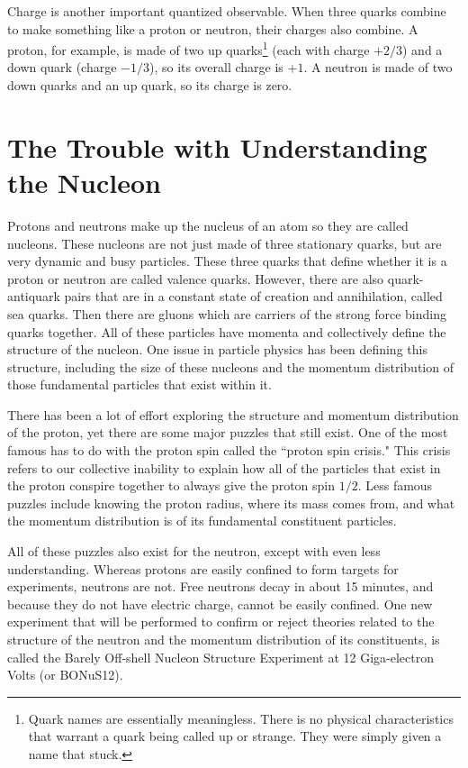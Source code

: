 Charge is another important quantized observable. When three quarks combine to make something like a proton or neutron, their charges also combine. A proton, for example, is made of two up quarks\footnote{Quark names are essentially meaningless. There is no physical characteristics that warrant a quark being called up or strange. They were simply given a name that stuck.} (each with charge $+2/3$) and a down quark (charge $-1/3$), so its overall charge is $+1$. A neutron is made of two down quarks and an up quark, so its charge is zero.

\section{The Trouble with Understanding the Nucleon}
Protons and neutrons make up the nucleus of an atom so they are called nucleons. These nucleons are not just made of three stationary quarks, but are very dynamic and busy particles. These three quarks that define whether it is a proton or neutron are called valence quarks. However, there are also quark-antiquark pairs that are in a constant state of creation and annihilation, called sea quarks. Then there are gluons which are carriers of the strong force binding quarks together. All of these particles have momenta and collectively define the structure of the nucleon. One issue in particle physics has been defining this structure, including the size of these nucleons and the momentum distribution of those fundamental particles that exist within it.

There has been a lot of effort exploring the structure and momentum distribution of the proton, yet there are some major puzzles that still exist. One of the most famous has to do with the proton spin called the ``proton spin crisis." This crisis refers to our collective inability to explain how all of the particles that exist in the proton conspire together to always give the proton spin $1/2$. Less famous puzzles include knowing the proton radius, where its mass comes from, and what the momentum distribution is of its fundamental constituent particles.

All of these puzzles also exist for the neutron, except with even less understanding. Whereas protons are easily confined to form targets for experiments, neutrons are not. Free neutrons decay in about 15 minutes, and because they do not have electric charge, cannot be easily confined. One new experiment that will be performed to confirm or reject theories related to the structure of the neutron and the momentum distribution of its constituents, is called the Barely Off-shell Nucleon Structure Experiment at 12 Giga-electron Volts (or BONuS12).
 

